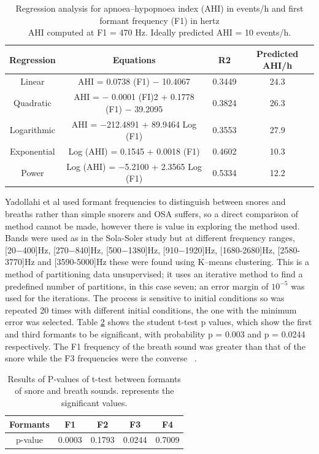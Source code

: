 \begin{table}[h]
\centering
\begin{tabular}{c c c c}
\toprule
Regression&Equations&R2&Predicted AHI/h\\ \midrule
Linear&AHI = 0.0738 (F1) − 10.4067&0.3449&24.3\\ 
Quadratic&AHI = − 0.0001 (FI)2 + 0.1778 (F1) − 39.2095&0.3824&26.3\\ 
Logarithmic&AHI = −212.4891 + 89.9464 Log (F1)&0.3553&27.9\\ 
Exponential&Log (AHI) = 0.1545 + 0.0018 (F1)&0.4602&10.3\\ 
Power&Log (AHI) = −5.2100 + 2.3565 Log (F1)&0.5334&12.2\\ \bottomrule
\end{tabular}
\caption{Regression analysis for apnoea–hypopnoea index (AHI) in events/h and first formant frequency (F1) in hertz \\ AHI computed at F1 = 470 Hz. Ideally predicted AHI = 10 events/h.}
\label{table:ng2008aformantstable2}
\end{table}
Yadollahi et al used formant frequencies to distinguish between snores and breaths rather than simple snorers and OSA suffers, so a direct comparison of method cannot be made, however there is value in exploring the method used. Bands were used as in the Sola-Soler study but at different frequency ranges, [20−400]Hz, [270−840]Hz, [500−1380]Hz, [910−1920]Hz, [1680-2680]Hz, [2580-3770]Hz and [3590-5000]Hz these were found using K–means clustering. This is a method of partitioning data unsupervised; it uses an iterative method to find a predefined number of partitions, in this case seven; an error margin of $10^{−5}$ was used for the iterations. The process is sensitive to initial conditions so was repeated 20 times with different initial conditions, the one with the minimum error was selected. Table \ref{table:yadollahi2009formant} shows the student t-test p values, which show the first and third formants to be significant, with probability p = 0.003 and p = 0.0244 respectively. The F1 frequency of the breath sound was greater than that of the snore while the F3 frequencies were the converse ~\cite{yadollahi2009formant}.

\begin{table}[h]
\centering
\begin{tabular}{c c c c c}
\toprule
Formants&F1&F2&F3&F4\\ \midrule
p-value&0.0003\*&0.1793&0.0244\*&0.7009\\ \bottomrule
\end{tabular}
\caption{Results of P-values of t-test between formants of snore and breath sounds. \* represents the significant values.}
\label{table:yadollahi2009formant}
\end{table}
